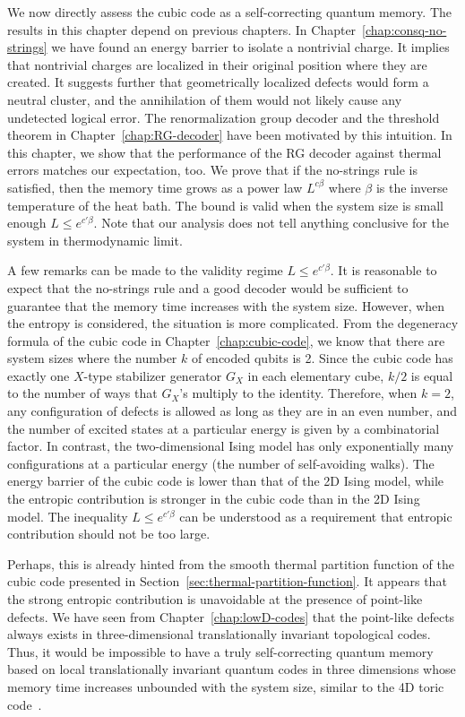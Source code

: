 
We now directly assess the cubic code as a self-correcting quantum memory.
The results in this chapter depend on previous chapters.
In Chapter~\ref{chap:consq-no-strings} 
we have found an energy barrier to isolate a nontrivial charge.
It implies that nontrivial charges are localized in their original position where they are created.
It suggests further that geometrically localized defects would form a neutral cluster,
and the annihilation of them would not likely cause any undetected logical error.
The renormalization group decoder and the threshold theorem 
in Chapter~\ref{chap:RG-decoder} have been motivated by this intuition.
In this chapter, we show that 
the performance of the RG decoder against thermal errors
matches our expectation, too.
We prove that if the no-strings rule is satisfied,
then the memory time grows as a power law 
$L^{c\beta}$ where $\beta$ is the inverse temperature of the heat bath.
The bound is valid when the system size is small enough $L \le e^{c' \beta}$.
Note that our analysis does not tell anything conclusive for the system in thermodynamic limit.

A few remarks can be made to the validity regime $L \le e^{c' \beta}$.
It is reasonable to expect that the no-strings rule and a good decoder
would be sufficient to guarantee that the memory time increases with the system size.
However, when the entropy is considered, the situation is more complicated.
From the degeneracy formula of the cubic code in Chapter~\ref{chap:cubic-code},
we know that there are system sizes where the number $k$ of encoded qubits is 2.
Since the cubic code has exactly one $X$-type stabilizer generator $G_X$ in each elementary cube,
$k/2$ is equal to the number of ways that $G_X$'s multiply to the identity.
Therefore, when $k = 2$, any configuration of defects is allowed
as long as they are in an even number,
and the number of excited states at a particular energy 
is given by a combinatorial factor.
In contrast, the two-dimensional Ising model has
only exponentially many configurations at a particular energy
(the number of self-avoiding walks).
The energy barrier of the cubic code is lower than that of the 2D Ising model,
while the entropic contribution is stronger in the cubic code
than in the 2D Ising model.
The inequality $L \le e^{c' \beta}$ can be understood as a requirement 
that entropic contribution should not be too large.

Perhaps, this is already hinted from the smooth thermal partition function of the cubic code
presented in Section~\ref{sec:thermal-partition-function}.
It appears that the strong entropic contribution is unavoidable at the presence of point-like defects.
We have seen from Chapter~\ref{chap:lowD-codes} 
that the point-like defects always exists in three-dimensional translationally invariant topological codes.
Thus, it would be impossible to have a truly self-correcting quantum memory
based on local translationally invariant quantum codes in three dimensions
whose memory time increases unbounded with the system size,
similar to the 4D toric code~\cite{AlickiHorodeckiHorodeckiEtAl2010thermal, ChesiLossBravyiEtAl2010Thermodynamic}.


